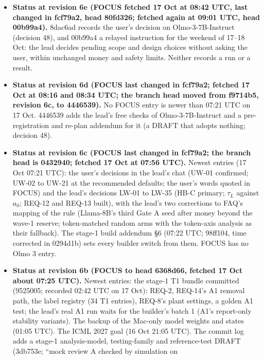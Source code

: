 \documentclass{article}
\theoremstyle{plain}
\theoremstyle{definition}
\theoremstyle{remark}
\begin{document}
\begin{itemize}
  \item \textbf{Status at revision 6e (FOCUS fetched 17 Oct at 08:42 UTC, last
        changed in fcf79a2, head 80fd326; fetched again at 09:01 UTC, head
        00b99a4).} 8dac6ad records the user's decision on Olmo-3-7B-Instruct
        (decision 48), and 00b99a4 a relayed instruction for the weekend of
        17--18 Oct: the lead decides pending scope and design choices without
        asking the user, within unchanged money and safety limits. Neither
        records a run or a result.
  \item \textbf{Status at revision 6d (FOCUS last changed in fcf79a2; fetched 17
        Oct at 08:16 and 08:34 UTC; the branch head moved from f9714b5, revision
        6c, to 4446539).} No FOCUS entry is newer than 07:21 UTC on 17 Oct.
        4446539 adds the lead's free checks of Olmo-3-7B-Instruct and a
        pre-registration and re-plan addendum for it (a DRAFT that adopts
        nothing; decision 48).
  \item \textbf{Status at revision 6c (FOCUS last changed in fcf79a2; the branch
        head is 0432940; fetched 17 Oct at 07:56 UTC).} Newest entries (17 Oct
        07:21 UTC): the user's decisions in the lead's chat (UW-01 confirmed;
        UW-02 to UW-21 at the recommended defaults; the user's words quoted in
        FOCUS) and the lead's decisions LW-01 to LW-35 (HB-C primary; $\tau_{L}$
        against $a_0$; REQ-12 and REQ-13 built), with the lead's two corrections
        to FAQ's mapping of the rule (Llama-8B's third Gate A seed after money
        beyond the wave-1 reserve; token-matched random arms with the token-axis
        analysis as their fallback). The stage-1 build addendum \S{}6 (07:22
        UTC; 98ff104, time corrected in 0294d1b) sets every builder switch from
        them. FOCUS has no Olmo 3 entry.
  \item \textbf{Status at revision 6b (FOCUS to head 6368d66, fetched 17 Oct
        about 07:25 UTC).} Newest entries: the stage-1 T1 bundle committed
        (9525005; recorded 02:42 UTC on 17 Oct): REQ-2, REQ-14's A1 removal
        path, the label registry (34 T1 entries), REQ-8's plant settings, a
        golden A1 test; the lead's real A1 run waits for the builder's batch 1
        (A1's report-only stability variants). The backup of the Mac-only model
        weights and states (01:05 UTC). The ICML 2027 goal (16 Oct 21:05 UTC).
        The commit log adds a stage-1 analysis-model, testing-family and
        reference-test DRAFT (3db753e; ``mock review A checked by simulation on

\end{itemize}
\end{document}
